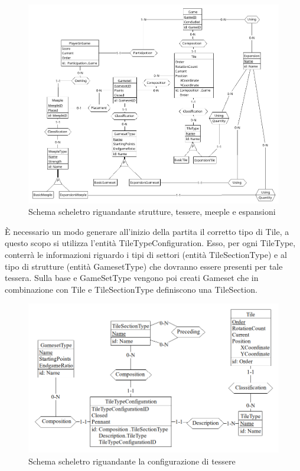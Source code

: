 \begin{figure}[ht]
    \centering\includegraphics[scale=0.4]{images/Progettazione/Concettuale/Scheletro2.png}
    \caption{Schema scheletro riguandante strutture, tessere, meeple e espansioni}
\end{figure}

È necessario un modo generare all'inizio della partita il corretto tipo di Tile, a questo scopo si utilizza l'entità TileTypeConfiguration. Esso, per ogni TileType, conterrà le informazioni riguardo i tipi di settori (entità TileSectionType) e al tipo di strutture (entità GamesetType) che dovranno essere presenti per tale tessera. Sulla base e GameSetType vengono poi creati Gameset che in combinazione con Tile e TileSectionType definiscono una TileSection.
\clearpage

\begin{figure}[ht]
    \centering\includegraphics[scale=0.35]{images/Progettazione/Concettuale/Scheletro3.png}
    \caption{Schema scheletro riguandante la configurazione di tessere}
\end{figure}


